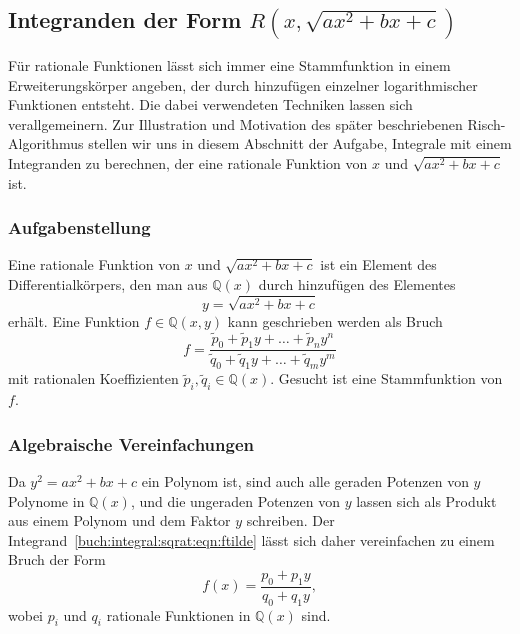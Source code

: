 %
%
%
\subsection{Integranden der Form $R(x,\sqrt{ax^2+bx+c})$
\label{buch:integral:subsection:rxy}}
Für rationale Funktionen lässt sich immer eine Stammfunktion in einem
Erweiterungskörper angeben, der durch hinzufügen einzelner logarithmischer
Funktionen entsteht.
Die dabei verwendeten Techniken lassen sich verallgemeinern.
Zur Illustration und Motivation des später beschriebenen Risch-Algorithmus
stellen wir uns in diesem Abschnitt der Aufgabe, Integrale
mit einem Integranden zu berechnen, der eine rationale Funktion von $x$
und $\sqrt{ax^2+bx+c}$ ist.

%
%
\subsubsection{Aufgabenstellung}
Eine rationale Funktion von $x$ und $\sqrt{ax^2+bx+c}$ ist ein
Element des Differentialkörpers, den man aus $\mathbb{Q}(x)$ durch
hinzufügen des Elementes
\[
y=\sqrt{ax^2+bx+c}
\]
erhält.
Eine Funktion $f\in\mathbb{Q}(x,y)$ kann geschrieben werden als Bruch
\begin{equation}
f
=
\frac{
\tilde{p}_0 + \tilde{p}_1y + \dots + \tilde{p}_n y^n
}{
\tilde{q}_0 + \tilde{q}_1y + \dots + \tilde{q}_m y^m
}
\label{buch:integral:sqrat:eqn:ftilde}
\end{equation}
mit rationalen Koeffizienten $\tilde{p}_i,\tilde{q}_i\in\mathbb{Q}(x)$.
Gesucht ist eine Stammfunktion von $f$.

%
%
\subsubsection{Algebraische Vereinfachungen}
Da $y^2=ax^2+bx+c$ ein Polynom ist, sind auch alle geraden Potenzen
von $y$ Polynome in $\mathbb{Q}(x)$,
und die ungeraden Potenzen von $y$ lassen sich als Produkt aus einem
Polynom und dem Faktor $y$ schreiben.
Der Integrand~\eqref{buch:integral:sqrat:eqn:ftilde} 
lässt sich daher vereinfachen zu einem Bruch der Form
\begin{equation}
f(x)
=
\frac{p_0+p_1y}{q_0+q_1y},
\label{buch:integral:sqrat:eqn:moebius}
\end{equation}
wobei $p_i$ und $q_i$ rationale Funktionen in $\mathbb{Q}(x)$ sind.

%
%
